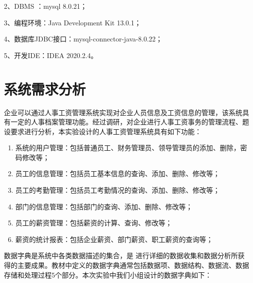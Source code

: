 \documentclass[withoutpreface,bwprint]{cumcmthesis} %
\begin{document}
2、DBMS ：mysql 8.0.21；

3、编程环境：Java Development Kit 13.0.1；

4、数据库JDBC接口：mysql-connector-java-8.0.22；

5、开发IDE：IDEA 2020.2.4。
\section{系统需求分析}

企业可以通过人事工资管理系统实现对企业人员信息及工资信息的管理，该系统具有一定的人事档案管理功能。经过调研，对企业进行人事工资事务的管理流程、题设要求进行分析，本实验设计的人事工资管理系统具有如下功能：
\begin{enumerate}
	\item 系统的用户管理：包括普通员工、财务管理员、领导管理员的添加、删除，密码修改等；
	\item 员工的信息管理：包括员工基本信息的查询、添加、删除、修改等；
	\item 员工的考勤管理：包括员工考勤情况的查询、添加、删除、修改等；
	\item 部门的信息管理：包括部门的查询、添加、删除、修改等；
	\item 员工的薪资管理：包括薪资的计算、查询、修改等；
	\item 薪资的统计报表：包括企业薪资、部门薪资、职工薪资的查询等；
\end{enumerate}

数据字典是系统中各类数据描述的集合，是
进行详细的数据收集和数据分析所获得的主要成果。教材中定义的数据字典通常包括数据项、数据结构、数据流、数据存储和处理过程5个部分。本次实验中我们小组设计的数据字典如下：
\end{document}
